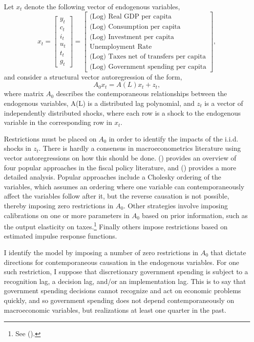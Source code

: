 \documentclass[12pt]{article}
\newcommand{\beq}{\begin{equation}}
\newcommand{\eeq}{\end{equation}}
\newcommand{\bdm}{\begin{displaymath}}
\newcommand{\edm}{\end{displaymath}}
\newcommand{\citee}[1]{\citename{#1} (\citeyear{#1})}
\begin{document}
Let $x_t$ denote the following vector of endogenous variables,
\bdm x_t = \left[ \begin{array}{c} y_t \\ c_t \\ i_t \\ u_t \\ t_t \\ g_t \end{array} \right] 
         = \left[ \begin{array}{c} \mbox{(Log) Real GDP per capita} \\ \mbox{(Log) Consumption per capita} \\ \mbox{(Log) Investment per capita} \\ 
             \mbox{Unemployment Rate} \\ \mbox{(Log) Taxes net of transfers per capita} \\ \mbox{(Log) Government spending per capita} \end{array} \right],
\edm
and consider a structural vector autoregression of the form,
\beq A_0 x_t = A(L) x_t + z_t, \eeq
where matrix $A_0$ describes the contemporaneous relationships between the endogenous variables, A(L) is a distributed lag polynomial, and $z_t$ is a vector of independently distributed shocks, where each row is a shock to the endogenous variable in the corresponding row in $x_t$.  

Restrictions must be placed on $A_0$ in order to identify the impacts of the i.i.d. shocks in $z_t$.  There is hardly a consensus in macroeconometrics literature using vector autoregressions on how this should be done.  \citee{hebous2010} provides an overview of four popular approaches in the fiscal policy literature, and \citee{perotti2007} provides a more detailed analysis.  Popular approaches include a Cholesky ordering of the variables, which assumes an ordering where one variable can contemporaneously affect the variables follow after it, but the reverse causation is not possible, thereby imposing zero restrictions in $A_0$.  Other strategies involve imposing calibrations on one or more parameters in $A_0$ based on prior information, such as the output elasticity on taxes.\footnote{See \citee{perotti2007}.}  Finally others impose restrictions based on estimated impulse response functions.

I identify the model by imposing a number of zero restrictions in $A_0$ that dictate directions for contemporaneous causation in the endogenous variables.  For one such restriction, I suppose that discretionary government spending is subject to a recognition lag, a decision lag, and/or an implementation lag.  This is to say that government spending decisions cannot recognize and act on economic problems quickly, and so government spending does not depend contemporaneously on macroeconomic variables, but realizations at least one quarter in the past.
\end{document}
